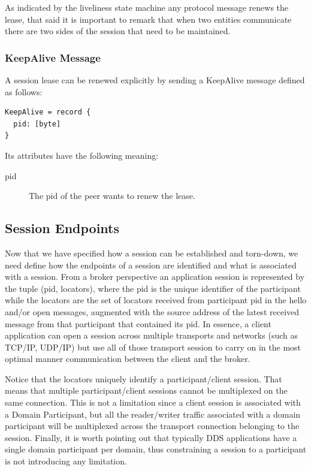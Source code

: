 \documentclass[a4paper,oneside,article]{memoir}
\begin{document}
As indicated by the liveliness state machine any protocol message renews the lease, that said it is
important to remark that when two entities communicate there are two sides of the session that need
to be maintained.

\subsubsection{KeepAlive Message}
A session lease can be renewed explicitly by sending a KeepAlive message defined as follows:
\begin{verbatim}
KeepAlive = record {
  pid: [byte]
}  
\end{verbatim}
Its attributes have the following meaning:
\begin{description}
\item[pid] The pid of the peer wants to renew the lease.
\end{description}


\subsection{Session Endpoints}

Now that we have specified how a session can be established and torn-down, we need define how the
endpoints of a session are identified and what is associated with a session.  From a broker
perspective an application session is represented by the tuple (pid, locators), where the pid is the
unique identifier of the participant while the locators are the set of locators received from
participant pid in the hello and/or open messages, augmented with the source address of the latest
received message from that participant that contained its pid.  In essence, a client application can
open a session across multiple transports and networks (such as TCP/IP, UDP/IP) but use all of those
transport session to carry on in the most optimal manner communication between the client and the
broker.

Notice that the locators uniquely identify a participant/client session.  That means that multiple
participant/client sessions cannot be multiplexed on the same connection.  This is not a limitation
since a client session is associated with a Domain Participant, but all the reader/writer traffic
associated with a domain participant will be multiplexed across the transport connection belonging
to the session.  Finally, it is worth pointing out that typically DDS applications have a single
domain participant per domain, thus constraining a session to a participant is not introducing any
limitation.
\end{document}

